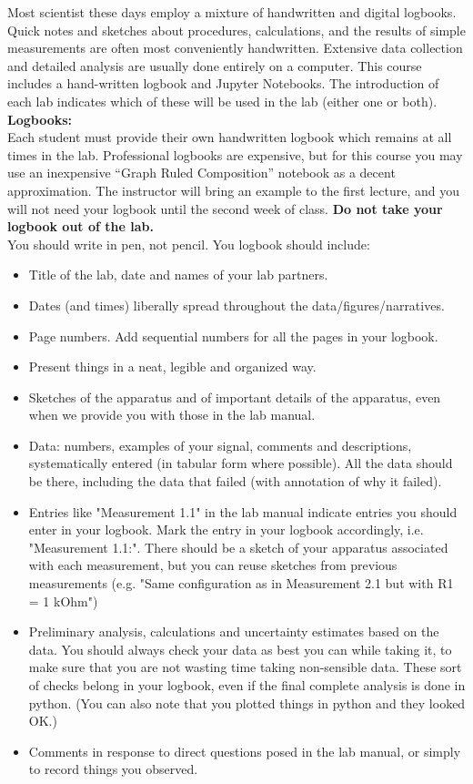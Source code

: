 \documentclass[12pt]{article}
\begin{document}
Most scientist these days employ a mixture of handwritten and digital
logbooks.  Quick notes and sketches about procedures, calculations,
and the results of simple measurements are often most conveniently
handwritten.  Extensive data collection and detailed analysis are
usually done entirely on a computer.  This course includes a
hand-written logbook and Jupyter Notebooks.  The introduction of each
lab indicates which of these will be used in the lab (either one or
both).\\

\noindent
\textbf {Logbooks:}\\ 
Each student must provide their own handwritten logbook which remains
at all times in the lab.  Professional logbooks are expensive, but for
this course you may use an inexpensive ``Graph Ruled Composition''
notebook as a decent approximation.  The instructor will bring an
example to the first lecture, and you will not need your logbook until
the second week of class.  {\bf Do not take your logbook out of the
  lab.}\\

You should write in pen, not pencil.  You logbook should include:
\begin{itemize}
\item Title of the lab, date and names of your lab partners.  
\item Dates (and times) liberally spread throughout the data/figures/narratives.
\item Page numbers. Add sequential numbers for all the pages in your logbook. 
\item Present things in a neat, legible and organized way.
\item Sketches of the apparatus and of important details of the apparatus, even when we provide you with those in the lab manual.
\item Data: numbers, examples of your signal, comments and descriptions, systematically entered (in tabular form where possible). All the data should be there, including the data that failed (with annotation of why it failed). 
\item Entries like "Measurement 1.1" in the lab manual indicate entries you should enter in your logbook. Mark the entry in your logbook accordingly, i.e. "Measurement 1.1:".
There should be a sketch of your apparatus associated with each measurement, but you can reuse sketches from previous measurements (e.g. "Same configuration as in Measurement 2.1 but with R1 = 1 kOhm")
\item Preliminary analysis, calculations and uncertainty estimates based on the data.
You should always check your data as best you can while taking it, to make sure that you are not wasting time taking non-sensible data.  These sort of checks belong in your logbook, even if the final complete analysis is done in python.  (You can also note that you plotted things in python and they looked OK.)
\item Comments in response to direct questions posed in the lab manual, or simply to record things you observed.
\end{itemize}
\end{document}
